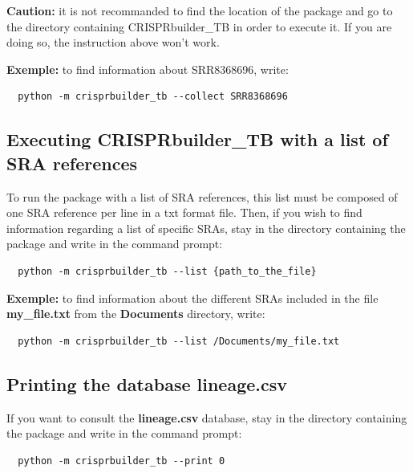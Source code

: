 \documentclass[twoside,a4paper,11pt,frenchb,openany]{report}
\begin{document}
\textbf{Caution:} it is not recommanded to find the location of the
package and go to the directory containing CRISPRbuilder\_TB in order to
execute it. If you are doing so, the instruction above won't work.

    \textbf{Exemple:} to find information about SRR8368696, write:

    \begin{verbatim}
  python -m crisprbuilder_tb --collect SRR8368696
\end{verbatim}


    \subsection{Executing CRISPRbuilder\_TB with a list of SRA
references}\label{executing-crisprbuilder_tb-with-a-list-of-sra-references}

    To run the package with a list of SRA references, this list must be
composed of one SRA reference per line in a txt format file. Then, if
you wish to find information regarding a list of specific SRAs, stay in
the directory containing the package and write in the command prompt:

    \begin{verbatim}
  python -m crisprbuilder_tb --list {path_to_the_file}
\end{verbatim}

    \textbf{Exemple:} to find information about the different SRAs included
in the file \textbf{my\_file.txt} from the \textbf{Documents} directory,
write:

    \begin{verbatim}
  python -m crisprbuilder_tb --list /Documents/my_file.txt
\end{verbatim}



    \subsection{Printing the database
lineage.csv}\label{printing-the-database-lineage.csv}

    If you want to consult the \textbf{lineage.csv} database, stay in the
directory containing the package and write in the command prompt:

    \begin{verbatim}
  python -m crisprbuilder_tb --print 0
\end{verbatim}
\end{document}
